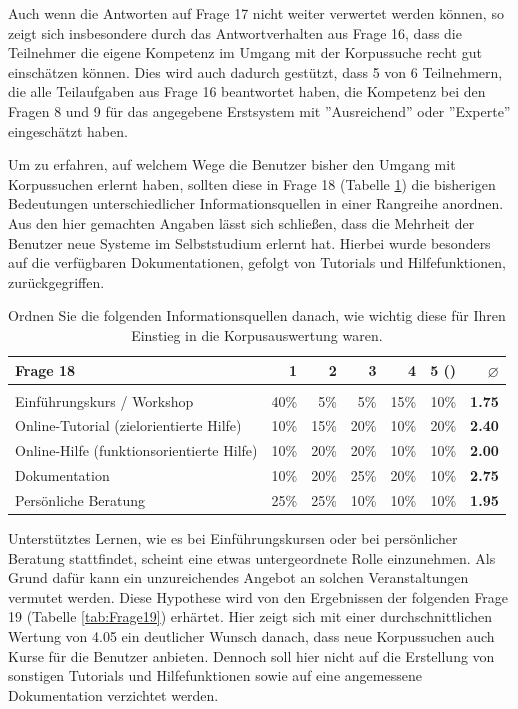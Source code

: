 	
Auch wenn die Antworten auf Frage 17 nicht weiter verwertet werden können, so zeigt sich insbesondere durch das Antwortverhalten aus Frage 16, dass die Teilnehmer die eigene Kompetenz im Umgang mit der Korpussuche recht gut einschätzen können. Dies wird auch dadurch gestützt, dass 5 von 6 Teilnehmern, die alle Teilaufgaben aus Frage 16 beantwortet haben, die Kompetenz bei den Fragen 8 und 9 für das angegebene Erstsystem mit ''Ausreichend'' oder ''Experte'' eingeschätzt haben.

Um zu erfahren, auf welchem Wege die Benutzer bisher den Umgang mit Korpussuchen erlernt haben, sollten diese in Frage 18 (Tabelle \ref{tab:Frage18}) die bisherigen Bedeutungen unterschiedlicher Informationsquellen in einer Rangreihe anordnen. Aus den hier gemachten Angaben lässt sich schließen, dass die Mehrheit der Benutzer neue Systeme im Selbststudium erlernt hat. Hierbei wurde besonders auf die verfügbaren Dokumentationen, gefolgt von Tutorials und Hilfefunktionen, zurückgegriffen.

	\begin{table}[H]
		\centering
		\begin{tabular}{l | r r r r r | r}
					Frage 18 & 1 & 2 & 3 & 4 & 5 () & \bf{$\varnothing$}	\\
					\hline\\
					Einführungskurs / Workshop 	& 40\% &   5\%        & 5\%             & 15\%       & 10\% & \bf{1.75} \\
					Online-Tutorial 
					(zielorientierte Hilfe) 		& 10\%        & 15\%      & 20\%          & 10\%         & 20\% & \bf{2.40} \\
					Online-Hilfe 
					(funktionsorientierte Hilfe) 	& 10\%        & 20\%      & 20\%         & 10\%         & 10\% & \bf{2.00} \\
					Dokumentation 			& 10\%        & 20\%        & 25\% & 20\%& 10\% & \bf{2.75} \\
					Persönliche Beratung 		& 25\%        & 25\% & 10\%        & 10\%        & 10\% & \bf{1.95} 
		\end{tabular}
		\caption{Ordnen Sie die folgenden Informationsquellen danach, wie wichtig diese für Ihren Einstieg in die Korpusauswertung waren.}\label{tab:Frage18}
	\end{table}

Unterstütztes Lernen, wie es bei Einführungskursen oder bei persönlicher Beratung stattfindet, scheint eine etwas untergeordnete Rolle einzunehmen. Als Grund dafür kann ein unzureichendes Angebot an solchen Veranstaltungen vermutet werden. Diese Hypothese wird von den Ergebnissen der folgenden Frage 19 (Tabelle \ref{tab:Frage19}) erhärtet. Hier zeigt sich mit einer durchschnittlichen Wertung von 4.05 ein deutlicher Wunsch danach, dass neue Korpussuchen auch Kurse für die Benutzer anbieten. Dennoch soll hier nicht auf die Erstellung von sonstigen Tutorials und Hilfefunktionen sowie auf eine angemessene Dokumentation verzichtet werden. 
	
